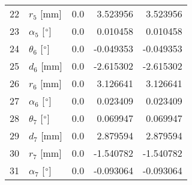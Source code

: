\documentclass{standalone}%
\begin{document}
\begin{tabular}{llrrr}
22 &              $r_{5}$ [mm] &       0.0 &   3.523956 &   3.523956 \\
23 &  $\alpha_{5}$ [$\degree$] &       0.0 &   0.010458 &   0.010458 \\
24 &  $\theta_{6}$ [$\degree$] &       0.0 &  -0.049353 &  -0.049353 \\
25 &              $d_{6}$ [mm] &       0.0 &  -2.615302 &  -2.615302 \\
26 &              $r_{6}$ [mm] &       0.0 &   3.126641 &   3.126641 \\
27 &  $\alpha_{6}$ [$\degree$] &       0.0 &   0.023409 &   0.023409 \\
28 &  $\theta_{7}$ [$\degree$] &       0.0 &   0.069947 &   0.069947 \\
29 &              $d_{7}$ [mm] &       0.0 &   2.879594 &   2.879594 \\
30 &              $r_{7}$ [mm] &       0.0 &  -1.540782 &  -1.540782 \\
31 &  $\alpha_{7}$ [$\degree$] &       0.0 &  -0.093064 &  -0.093064 \\
\bottomrule
\end{tabular}
%
\end{document}
